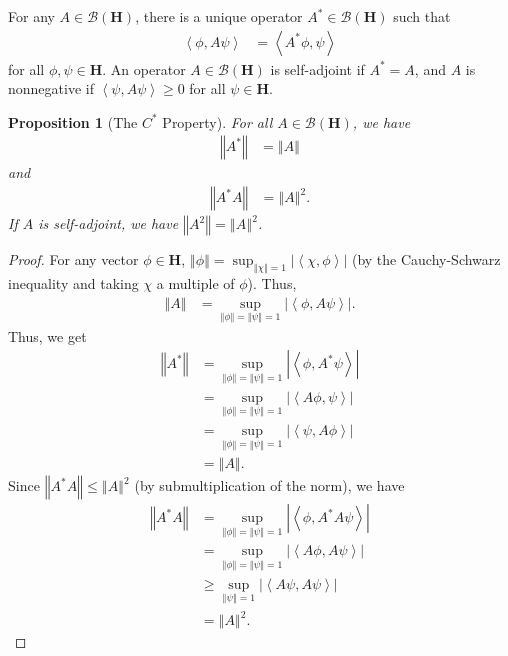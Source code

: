\documentclass[12pt]{extarticle}
\newcommand{\iprod}[2]{\left\langle #1,#2\right\rangle}
\newcommand{\norm}[1]{\left\Vert #1\right\Vert}
\theoremstyle{plain}
\newtheorem*{proposition}{Proposition}%
\theoremstyle{definition}
\theoremstyle{remark}
\begin{document}
  For any $A\in \mathcal{B}(\mathbf{H})$, there is a unique operator $A^{\ast}\in \mathcal{B}(\mathbf{H})$ such that
  \begin{align*}
    \iprod{\phi}{A\psi} &= \iprod{A^{\ast}\phi}{\psi}
  \end{align*}
  for all $\phi,\psi \in \mathbf{H}$. An operator $A\in \mathcal{B}(\mathbf{H})$ is self-adjoint if $A^{\ast} = A$, and $A$ is nonnegative if $\iprod{\psi}{A\psi} \geq 0$ for all $\psi \in \mathbf{H}$.
  \begin{proposition}[The $C^{\ast}$ Property]
    For all $A\in \mathcal{B}(\mathbf{H})$, we have
    \begin{align*}
      \norm{A^{\ast}} &= \norm{A}
    \end{align*}
    and
    \begin{align*}
      \norm{A^{\ast}A} &= \norm{A}^2.
    \end{align*}
    If $A$ is self-adjoint, we have $\norm{A^2} = \norm{A}^2$.
  \end{proposition}
  \begin{proof}
    For any vector $\phi \in \mathbf{H}$, $\norm{\phi} = \sup_{\norm{\chi} = 1}|\iprod{\chi}{\phi}|$ (by the Cauchy-Schwarz inequality and taking $\chi$ a multiple of $\phi$). Thus,
    \begin{align*}
      \norm{A} &= \sup_{\norm{\phi} = \norm{\psi} = 1} |\iprod{\phi}{A\psi}|.
    \end{align*}
    Thus, we get
    \begin{align*}
      \norm{A^{\ast}} &= \sup_{\norm{\phi} = \norm{\psi} = 1} |\iprod{\phi}{A^{\ast}\psi}|\\
                      &= \sup_{\norm{\phi} = \norm{\psi} = 1} |\iprod{A\phi}{\psi}|\\
                      &=\sup_{\norm{\phi} = \norm{\psi} = 1} |\iprod{\psi}{A\phi}|\\
                      &= \norm{A}.
    \end{align*}
    Since $\norm{A^{\ast}A} \leq \norm{A}^2$ (by submultiplication of the norm), we have
    \begin{align*}
      \norm{A^{\ast}A} &= \sup_{\norm{\phi} = \norm{\psi} = 1}|\iprod{\phi}{A^{\ast}A\psi}|\\
                       &= \sup_{\norm{\phi} = \norm{\psi} = 1} |\iprod{A\phi}{A\psi}|\\
                       &\geq \sup_{\norm{\psi} = 1}|\iprod{A\psi}{A\psi}|\\
                       &= \norm{A}^2.
    \end{align*}
  \end{proof}
\end{document}
